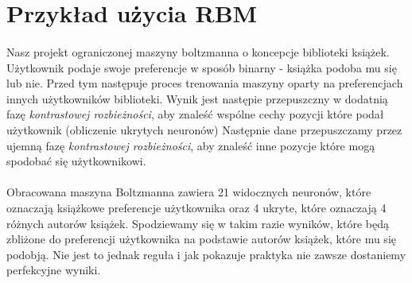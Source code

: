 \section{Przykład użycia RBM}
    \paragraph{}
	Nasz projekt ograniczonej maszyny boltzmanna o koncepcje biblioteki książek.
	Użytkownik podaje swoje preferencje w sposób binarny - książka podoba mu się lub nie.
	Przed tym następuje proces trenowania maszyny oparty na preferencjach innych użytkowników biblioteki.
	Wynik jest następie przepuszczny w dodatnią fazę \textit{kontrastowej rozbieżności},
	aby znaleść wspólne cechy pozycji które podał użytkownik (obliczenie ukrytych neuronów)
	Następnie dane przepuszczamy przez ujemną fazę \textit{kontrastowej rozbieżności},
	aby znaleść inne pozycje które mogą spodobać się użytkownikowi.
    \paragraph{}
	Obracowana maszyna Boltzmanna zawiera 21 widocznych neuronów, które oznaczają książkowe preferencje użytkownika oraz 4 ukryte, które oznaczają  4
	różnych autorów książek. Spodziewamy się w takim razie wyników, które będą zbliżone do preferencji użytkownika na podstawie autorów książek, które mu się
	podobją. Nie jest to jednak reguła i jak pokazuje praktyka nie zawsze dostaniemy perfekcyjne wyniki.